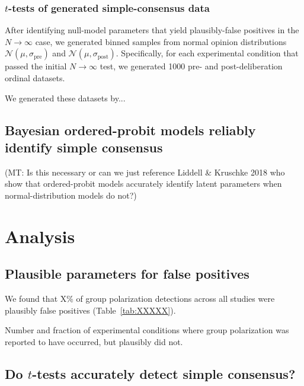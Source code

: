 \documentclass[11pt, letterpaper]{article}
\newcommand{\mt}[1]{{\textcolor{myorange} {({\tiny MT:} #1)}}}
\newcommand{\sigmapre}{\sigma_\mathrm{pre}}
\newcommand{\sigmapost}{\sigma_\mathrm{post}}
\newcommand{\normalpre}{\mathcal{N}(\mu, \sigmapre)}
\newcommand{\normalpost}{\mathcal{N}(\mu, \sigmapost)}
\begin{document}
\subsubsection{$t$-tests of generated simple-consensus data}

After identifying null-model parameters that yield plausibly-false positives 
in the $N \to \infty$ case, we generated binned samples from normal opinion 
distributions $\normalpre$ and $\normalpost$. Specifically, for each experimental
condition that passed the initial $N \to \infty$ test, we generated 1000 
pre- and post-deliberation ordinal datasets. 

We generated these datasets by...

\subsection{Bayesian ordered-probit models reliably identify simple consensus}

\mt{Is this necessary or can we just reference Liddell \& Kruschke 2018 who show
that ordered-probit models accurately identify latent parameters when normal-distribution
models do not?}

\section{Analysis}

\subsection{Plausible parameters for false positives}

We found that X\% of group polarization detections across all studies were 
plausibly false positives (Table~\ref{tab:XXXXX}).

\vspace{.5em}
% 
\begin{table}[H]
    \begin{center}
      \caption{Number and fraction of experimental conditions where group polarization was
               reported to have occurred, but plausibly did not.}
      \vspace{.5em}
      
    \end{center}
  \end{table}



\subsection{Do $t$-tests accurately detect simple consensus?}
\end{document}
